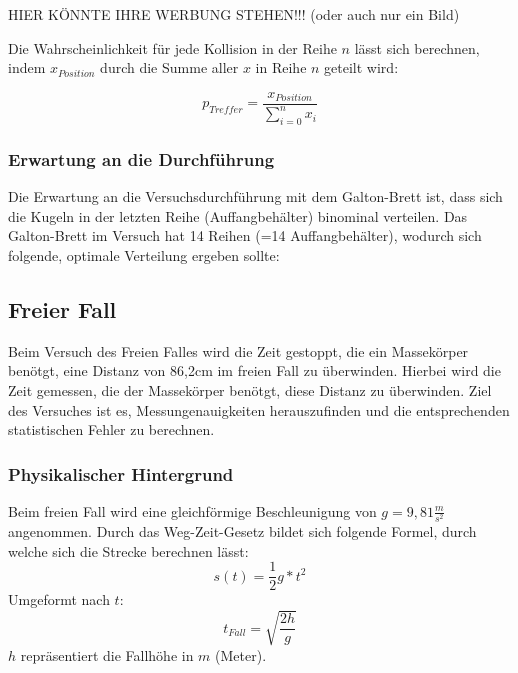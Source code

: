 HIER KÖNNTE IHRE WERBUNG STEHEN!!! (oder auch nur ein Bild)

Die Wahrscheinlichkeit für jede Kollision in der Reihe $n$ lässt sich berechnen, indem $x_{Position}$ durch die Summe aller $x$ in Reihe $n$ geteilt wird:

\begin{equation}
    p_{Treffer}=\frac{x_{Position}}{\sum_{i=0}^n x_i}
\end{equation}

\subsubsection{Erwartung an die Durchführung}
Die Erwartung an die Versuchsdurchführung mit dem Galton-Brett ist, dass sich die Kugeln in der letzten Reihe (Auffangbehälter) binominal verteilen. Das Galton-Brett im Versuch hat 14 Reihen (=14 Auffangbehälter), wodurch sich folgende, optimale Verteilung ergeben sollte:

\begin{table}[thb]
    \centering
    \caption{Erwartungswert am Galton-Brett}
  \end{table}

\subsection{Freier Fall}
Beim Versuch des Freien Falles wird die Zeit gestoppt, die ein Massekörper benötgt, eine Distanz von 86,2cm im freien Fall zu überwinden. Hierbei wird die Zeit gemessen, die der Massekörper benötgt, diese Distanz zu überwinden.
Ziel des Versuches ist es, Messungenauigkeiten herauszufinden und die entsprechenden statistischen Fehler zu berechnen.

\subsubsection{Physikalischer Hintergrund}
Beim freien Fall wird eine gleichförmige Beschleunigung von $g=9,81\frac{m}{s^{2}}$ angenommen. Durch das Weg-Zeit-Gesetz bildet sich folgende Formel, durch welche sich die Strecke berechnen lässt:
\begin{equation}
    s(t)=\frac{1}{2}g*t^{2}
\end{equation}
Umgeformt nach $t$:
\begin{equation}
    t_{Fall}=\sqrt{\frac{2h}{g}}
\end{equation}
$h$ repräsentiert die Fallhöhe in $m$ (Meter).

